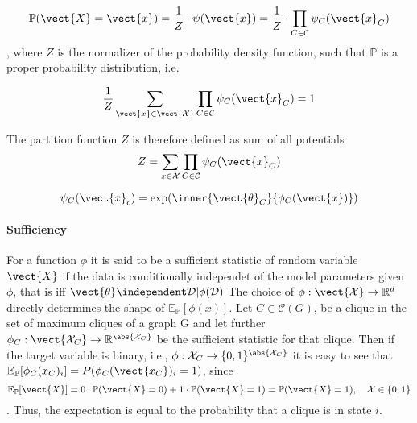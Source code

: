 \begin{equation}
        \mathbb{P}(\vect{X}=\vect{x}) = \frac{1}{Z} \cdot \psi(\vect{x})= \frac{1}{Z} \cdot \prod_{C \in \mathcal{C}} \psi_C(\vect{x}_C)
\end{equation},
where $Z$ is the normalizer of the probability density function, such that $\mathbb{P}$ is a proper probability distribution, i.e.

\begin{equation}
    \frac{1}{Z} \sum_{\vect{x}\in \mathcal{\vect{X}}} \prod_{C \in \mathcal{C}} \psi_C(\vect{x}_C) = 1 
\end{equation}

The partition function $Z$ is therefore defined as sum of all potentials
\begin{equation}
    Z = \sum_{x\in \mathcal{X}} \prod_{C \in \mathcal{C}} \psi_C(\vect{x}_C)
\end{equation}

\begin{equation}
    \psi_C(\vect{x}_c) = \exp(\inner{\vect{\theta}_C}{\phi_C(\vect{x})})
\end{equation}

\paragraph*{Sufficiency}
    For a function $\phi$ it is said to be a sufficient statistic of random variable $\vect{X}$ if the data is conditionally independet of the model parameters given $\phi$, that is iff $\vect{\theta}\independent \mathcal{D} \lvert \phi(\mathcal{D})$
    The choice of $\phi: \vect{\mathcal{X}} \rightarrow \mathbb{R}^d$ directly determines the shape of  $\mathbb{E}_{\mathbb{P}}[\phi(x)]$.
    Let $C \in \mathcal{C}(G)$, be a clique in the set of maximum cliques of a graph G and let further
    $\phi_C: \vect{\mathcal{X}_C} \rightarrow \mathbb{R}^{\abs{\mathcal{X}_C}}$ be the sufficient statistic for that clique.
    Then if the target variable is binary, i.e., $\phi : \mathcal{X}_C \rightarrow \{0,1\}^{\abs{\mathcal{X}_C}}$ it is easy to see that  $\mathbb{E}_{\mathbb{P}}[\phi_C(x_C)_i] = P(\phi_C(\vect{x_C})_i = 1)$, since
    \begin{equation}
        \mathbb{E}_{\mathbb{P}}[\vect{X}] = 0 \cdot \mathbb{P}(\vect{X} = 0) + 1 \cdot \mathbb{P}(\vect{X}= 1) = \mathbb{P}(\vect{X} = 1), \quad \mathcal{X} \in \{0,1\}
    \end{equation}.
    Thus, the expectation is equal to the probability that a clique is in state $i$.
    
